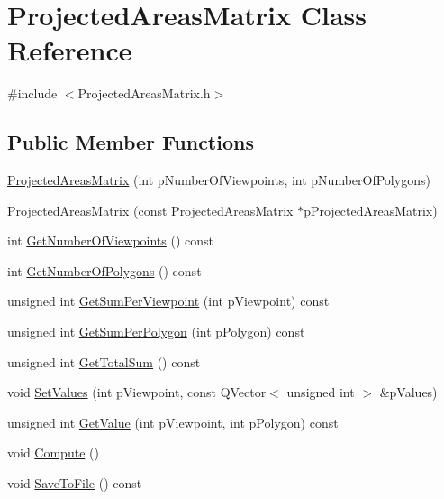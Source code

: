 \hypertarget{class_projected_areas_matrix}{\section{Projected\+Areas\+Matrix Class Reference}
\label{class_projected_areas_matrix}
}


{\ttfamily \#include $<$Projected\+Areas\+Matrix.\+h$>$}

\subsection*{Public Member Functions}
\begin{DoxyCompactItemize}
\item 
\hyperlink{class_projected_areas_matrix_a129e6c7a93c2c8d69a258399fa725be4}{Projected\+Areas\+Matrix} (int p\+Number\+Of\+Viewpoints, int p\+Number\+Of\+Polygons)
\item 
\hyperlink{class_projected_areas_matrix_a44019a731f9d882bd72f4498cfbb35a0}{Projected\+Areas\+Matrix} (const \hyperlink{class_projected_areas_matrix}{Projected\+Areas\+Matrix} $\ast$p\+Projected\+Areas\+Matrix)
\item 
int \hyperlink{class_projected_areas_matrix_a67f41fd64b2e0909a19751c7a6adb520}{Get\+Number\+Of\+Viewpoints} () const 
\item 
int \hyperlink{class_projected_areas_matrix_a3a33b7776927250d46e48010096b6f5d}{Get\+Number\+Of\+Polygons} () const 
\item 
unsigned int \hyperlink{class_projected_areas_matrix_a24b7121f91cf87060a15f35d146d4fad}{Get\+Sum\+Per\+Viewpoint} (int p\+Viewpoint) const 
\item 
unsigned int \hyperlink{class_projected_areas_matrix_aae702f18b408ad2798310307119f0efb}{Get\+Sum\+Per\+Polygon} (int p\+Polygon) const 
\item 
unsigned int \hyperlink{class_projected_areas_matrix_a94900bb0cb32473fea98baff3f97f804}{Get\+Total\+Sum} () const 
\item 
void \hyperlink{class_projected_areas_matrix_ab7dca98fc4d6eba761074872d0520567}{Set\+Values} (int p\+Viewpoint, const Q\+Vector$<$ unsigned int $>$ \&p\+Values)
\item 
unsigned int \hyperlink{class_projected_areas_matrix_a0df4213a8b8aaefe466631388f7dfaa8}{Get\+Value} (int p\+Viewpoint, int p\+Polygon) const 
\item 
void \hyperlink{class_projected_areas_matrix_a7c63a0e48e51d2a63abeb470373e86a7}{Compute} ()
\item 
void \hyperlink{class_projected_areas_matrix_a383a312b1ca476c968db47ac1a28d129}{Save\+To\+File} () const 
\end{DoxyCompactItemize}
